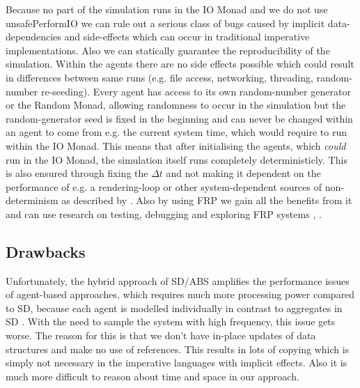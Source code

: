Because no part of the simulation runs in the IO Monad and we do not use unsafePerformIO we can rule out a serious class of bugs caused by implicit data-dependencies and side-effects which can occur in traditional imperative implementations. Also we can statically guarantee the reproducibility of the simulation. Within the agents there are no side effects possible which could result in differences between same runs (e.g. file access, networking, threading, random-number re-seeding). Every agent has access to its own random-number generator or the Random Monad, allowing randomness to occur in the simulation but the random-generator seed is fixed in the beginning and can never be changed within an agent to come from e.g. the current system time, which would require to run within the IO Monad. This means that after initialising the agents, which \textit{could} run in the IO Monad, the simulation itself runs completely deterministicly. This is also ensured through fixing the $\Delta t$ and not making it dependent on the performance of e.g. a rendering-loop or other system-dependent sources of non-determinism as described by \cite{perez_testing_2017}. Also by using FRP we gain all the benefits from it and can use research on testing, debugging and exploring FRP systems \cite{perez_testing_2017}, \cite{perez_back_2017}.

\subsection*{Drawbacks}
Unfortunately, the hybrid approach of SD/ABS amplifies the performance issues of agent-based approaches, which requires much more processing power compared to SD, because each agent is modelled individually in contrast to aggregates in SD \cite{macal_agent-based_2010}. With the need to sample the system with high frequency, this issue gets worse. The reason for this is that we don't have in-place updates of data structures and make no use of references. This results in lots of copying which is simply not necessary in the imperative languages with implicit effects. Also it is much more difficult to reason about time and space in our approach. %

